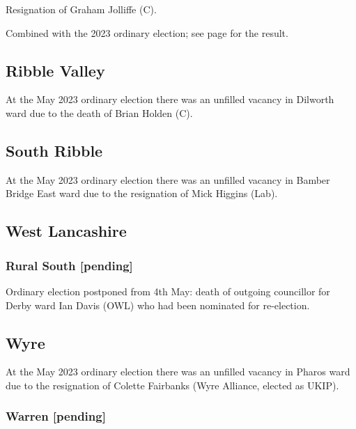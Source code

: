 \documentclass[a4paper,openany]{book}
\begin{document}
\begin{resultsiii}
Resignation of Graham Jolliffe (C).

Combined with the 2023 ordinary election; see page \pageref{PrestonPrestonRuralEast} for the result.

\subsection*{Ribble Valley}

At the May 2023 ordinary election there was an unfilled vacancy in Dilworth ward due to the death of Brian Holden (C).%

\subsection*{South Ribble}

At the May 2023 ordinary election there was an unfilled vacancy in Bamber Bridge East ward due to the resignation of Mick Higgins (Lab).%

\subsection*{West Lancashire}

\subsubsection*{Rural South \hspace*{\fill}\nolinebreak[1]%
	\enspace\hspace*{\fill}
	[pending]}


Ordinary election postponed from 4th May: death of outgoing councillor for Derby ward Ian Davis (OWL) who had been nominated for re-election.

\subsection*{Wyre}

At the May 2023 ordinary election there was an unfilled vacancy in Pharos ward due to the resignation of Colette Fairbanks (Wyre Alliance, elected as UKIP).%

\subsubsection*{Warren \hspace*{\fill}\nolinebreak[1]%
	\enspace\hspace*{\fill}
	[pending]}


\end{resultsiii}
\end{document}
